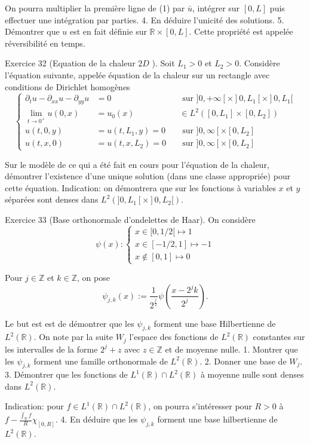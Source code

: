\documentclass[12pt,a4paper]{article}
\begin{document}
On pourra multiplier la première ligne de (1) par \(\bar{u}\), intégrer sur \([0, L]\) puis effectuer une intégration par parties.
4. En déduire l'unicité des solutions.
5. Démontrer que \(u\) est en fait définie sur \(\mathbb{R} \times[0, L]\). Cette propriété est appelée réversibilité en temps.

Exercice 32 (Equation de la chaleur \(2 D\) ). Soit \(L_{1}>0\) et \(L_{2}>0\). Considère l'équation suivante, appelée équation de la chaleur sur un rectangle avec conditions de Dirichlet homogènes
\[
\left\{\begin{aligned}
\partial_{t} u-\partial_{x x} u-\partial_{y y} u & =0 & & \text { sur }] 0,+\infty[\times] 0, L_{1}[\times] 0, L_{1}[ \\
\lim _{t \rightarrow 0^{+}} u(0, x) & =u_{0}(x) & & \in L^{2}\left(\left[0, L_{1}\right] \times\left[0, L_{2}\right]\right) \\
u(t, 0, y) & =u\left(t, L_{1}, y\right)=0 & & \text { sur }] 0, \infty\left[\times\left[0, L_{2}\right]\right. \\
u(t, x, 0) & =u\left(t, x, L_{2}\right)=0 & & \text { sur }] 0, \infty\left[\times\left[0, L_{2}\right]\right.
\end{aligned}\right.
\]

Sur le modèle de ce qui a été fait en cours pour l'équation de la chaleur, démontrer l'existence d'une unique solution (dans une classe appropriée) pour cette équation. Indication: on démontrera que sur les fonctions à variables \(x\) et \(y\) séparées sont denses dans \(L^{2}(] 0, L_{1}[\times] 0, L_{2}[)\).

Exercice 33 (Base orthonormale d'ondelettes de Haar). On considère
\[
\psi(x):\left\{\begin{array}{l}
x \in[0,1 / 2[\mapsto 1 \\
x \in[-1 / 2,1] \mapsto-1 \\
x \notin[0,1] \mapsto 0
\end{array}\right.
\]

Pour \(j \in \mathbb{Z}\) et \(k \in \mathbb{Z}\), on pose
\[
\psi_{j, k}(x):=\frac{1}{2^{\frac{j}{2}}} \psi\left(\frac{x-2^{j} k}{2^{j}}\right) .
\]

Le but est est de démontrer que les \(\psi_{j, k}\) forment une base Hilbertienne de \(L^{2}(\mathbb{R})\). On note par la suite \(W_{j}\) l'espace des fonctions de \(L^{2}(\mathbb{R})\) constantes sur les intervalles de la forme \(2^{j}+z\) avec \(z \in \mathbb{Z}\) et de moyenne nulle.
1. Montrer que les \(\psi_{j, k}\) forment une famille orthonormale de \(L^{2}(\mathbb{R})\).
2. Donner une base de \(W_{j}\).
3. Démontrer que les fonctions de \(L^{1}(\mathbb{R}) \cap L^{2}(\mathbb{R})\) à moyenne nulle sont denses dans \(L^{2}(\mathbb{R})\).

Indication: pour \(f \in L^{1}(\mathbb{R}) \cap L^{2}(\mathbb{R})\), on pourra s'intéresser pour \(R>0\) à \(f-\frac{\int_{\mathbb{R}} f}{R} \chi_{[0, R]}\).
4. En déduire que les \(\psi_{j, k}\) forment une base hilbertienne de \(L^{2}(\mathbb{R})\).
\end{document}
